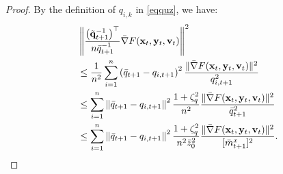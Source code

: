 \documentclass{article}
\theoremstyle{plain}
\theoremstyle{definition}
\theoremstyle{remark}
\begin{document}
\begin{proof}
By the definition of $q_{i,k}$ in \cref{eqquz}, we have:
\begin{align} 
&\left\|\frac{\big(\tilde{\mathbf{q}}_{t+1}^{-1}\big)^\top}{n\bar{q}_{t+1}^{-1}} \bar{\nabla} F(\mathbf{x}_t, \mathbf{y}_t, \mathbf{v}_t)
\right\|^2 \notag\\
&\leq 
\frac{1}{n^2} \sum_{i=1}^n 
\left(
\bar{q}_{t+1} - q_{i,t+1} 
\right)^2 
\frac{\| \bar{\nabla} F(\mathbf{x}_{t}, \mathbf{y}_{t}, \mathbf{v}_{t}) \|^2}{q_{i,t+1}^{2}}\notag \\
&\leq  \sum_{i=1}^n 
\left\| 
\bar{q}_{t+1} - q_{i,t+1}\right\|^2 \frac{1+\zeta_q^2}{n^2}\frac{\| \bar{\nabla} F(\mathbf{x}_{t}, \mathbf{y}_{t}, \mathbf{v}_{t}) \|^2}{\bar{q}_{t+1}^2}\notag\\
&\leq \sum_{i=1}^n 
\left\| 
\bar{q}_{t+1} - q_{i,t+1}\right\|^2 \frac{1+\zeta_q^2}{n^2\bar{z}_0^2}\frac{\| \bar{\nabla} F(\mathbf{x}_{t}, \mathbf{y}_{t}, \mathbf{v}_{t}) \|^2}{[\bar{m}^x_{t+1}]^2}.\label{eq113}
\end{align}


\end{proof}
\end{document}
